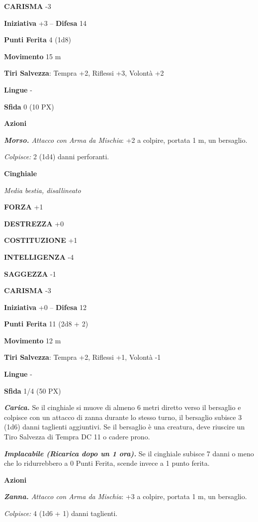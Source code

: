 \begin{multicols}{2}
	\textbf{CARISMA} -3

	\textbf{Iniziativa} +3 -- \textbf{Difesa} 14

	\textbf{Punti Ferita} 4 (1d8)

	\textbf{Movimento} 15 m

	\textbf{Tiri Salvezza}: Tempra +2, Riflessi +3, Volontà +2

	\textbf{Lingue} -

	\textbf{Sfida} 0 (10 PX)

	\textbf{Azioni}

	\textit{\textbf{Morso.} Attacco con Arma da Mischia}: +2 a colpire, portata 1 m, un bersaglio.

	\textit{Colpisce:} 2 (1d4) danni perforanti.

	\medskip\textbf{Cinghiale}

	\textit{Media bestia, disallineato}

	\textbf{FORZA} +1

	\textbf{DESTREZZA} +0

	\textbf{COSTITUZIONE} +1

	\textbf{INTELLIGENZA} -4

	\textbf{SAGGEZZA} -1

	\textbf{CARISMA} -3

	\textbf{Iniziativa} +0 -- \textbf{Difesa} 12

	\textbf{Punti Ferita} 11 (2d8 + 2)

	\textbf{Movimento} 12 m

	\textbf{Tiri Salvezza}: Tempra +2, Riflessi +1, Volontà -1

	\textbf{Lingue} -

	\textbf{Sfida} 1/4 (50 PX)

	\textit{\textbf{Carica.}} Se il cinghiale si muove di almeno 6 metri diretto verso il bersaglio e colpisce con un attacco di zanna durante lo stesso turno, il bersaglio subisce 3 (1d6) danni taglienti aggiuntivi. Se il bersaglio è una creatura, deve riuscire un Tiro Salvezza di Tempra
	DC 11 o cadere prono.

	\textit{\textbf{Implacabile (Ricarica dopo un 1 ora).}} Se il cinghiale subisce 7 danni o meno che lo ridurrebbero a 0 Punti Ferita, scende invece a 1 punto ferita.

	\textbf{Azioni}

	\textit{\textbf{Zanna.} Attacco con Arma da Mischia}: +3 a colpire, portata 1 m, un bersaglio.

	\textit{Colpisce:} 4 (1d6 + 1) danni taglienti.


\end{multicols}
